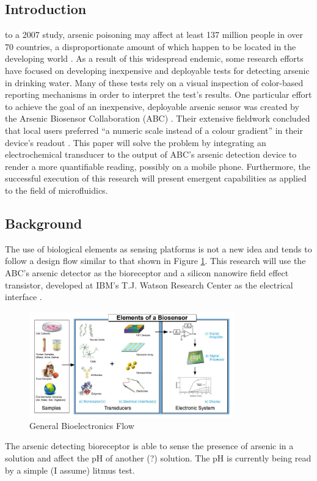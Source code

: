 \documentclass[11pt,journal,compsoc, onecolumn]{IEEEtran}
\begin{document}
\subsection{Introduction}
 to a 2007 study, arsenic poisoning may affect
at least 137 million people in over 70 countries, a disproportionate amount of
which happen to be located in the developing world \cite{RGS:arsenic_pollution}.
As a result of this widespread endemic, some research efforts have focused on
developing inexpensive and deployable tests for detecting arsenic in drinking
water. Many of these tests rely on a visual inspection of color-based
reporting mechanisms in order to interpret the test's results. One
particular effort to achieve the goal of an inexpensive, deployable arsenic
sensor was created by the Arsenic Biosensor Collaboration (ABC) \cite{ABC:home}.
Their extensive fieldwork concluded that local users preferred
``a numeric scale instead of a colour gradient'' in their device's readout
\cite{ABC:field}.
This paper will solve the problem by integrating an electrochemical transducer
to the output of ABC's arsenic detection device to render a more quantifiable
reading, possibly on a mobile phone. Furthermore, the successful execution of
this research will present emergent capabilities as applied to the field of
microfluidics.

\subsection{Background}
The use of biological elements as sensing platforms is not a new
idea \cite{phbiosensor:short} and tends to follow a design flow
similar to that shown in Figure \ref{fig:flow}. This research will use the
ABC's arsenic detector as the bioreceptor and a
silicon nanowire field effect transistor, developed at IBM's T.J. Watson
Research Center as the electrical interface \cite{nanowire}. 
\begin{figure}[t]
	\centering
	\includegraphics[width=3.5in]{Biosensor_System}
	\caption{General Bioelectronics Flow \cite{wiki:Biosensor_image}}
	\label{fig:flow}
\end{figure}
The arsenic detecting bioreceptor is able to sense the presence of arsenic in a
solution and affect the pH of another (?) solution. The pH is currently being
read by a simple (I assume) litmus test.
\end{document}
